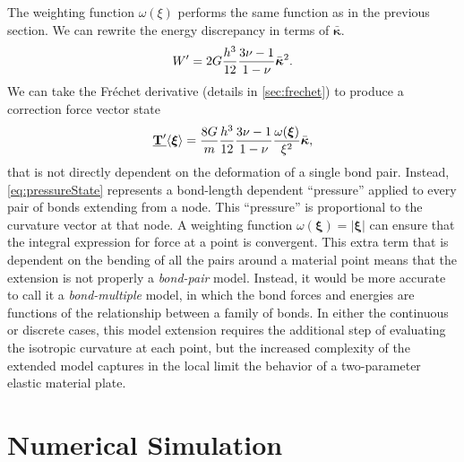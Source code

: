 %
The weighting function \(\omega(\xi)\) performs the same function as in the previous section.
We can rewrite the energy discrepancy in terms of \(\bar{\boldsymbol{\kappa}}\).
%
\begin{equation}
    W'=2G\frac{h^3}{12}\frac{3\nu-1}{1-\nu}\bar{\boldsymbol{\kappa}}^2. \notag
\end{equation}
%
We can take the Fr\'{e}chet derivative (details in \ref{sec:frechet}) to produce a correction force vector state
%
\begin{equation}
    \vstate{T'}{}{\boldsymbol{\xi}}=\frac{8G}{m}\frac{h^3}{12}\frac{3\nu-1}{1-\nu}\frac{\omega(\boldsymbol{\xi})}{\xi^2} \bar{\boldsymbol{\kappa}},
    \label{eq:pressureState}
\end{equation}
%
that is not directly dependent on the deformation of a single bond pair.  Instead, \cref{eq:pressureState} represents a bond-length dependent ``pressure'' applied to every pair of bonds extending from a node.  This ``pressure'' is proportional to the curvature vector at that node.
A weighting function \(\omega(\boldsymbol{\xi}) = |\boldsymbol{\xi}|\) can ensure that the integral expression for force at a point is convergent.  This extra term that is dependent on the bending of all the pairs around a material point means that the extension is not properly a \textit{bond-pair} model.  Instead, it would be more accurate to call it a \textit{bond-multiple} model, in which the bond forces and energies are functions of the relationship between a family of bonds.  In either the continuous or discrete cases, this model extension requires the additional step of evaluating the isotropic curvature at each point, but the increased complexity of the extended model captures in the local limit the behavior of a two-parameter elastic material plate.
%
\chapter{Numerical Simulation}
